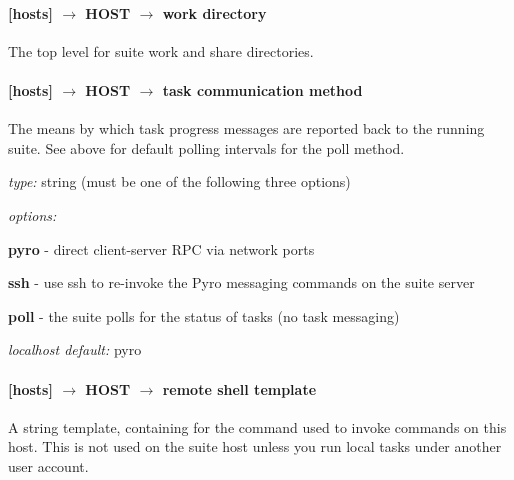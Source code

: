 \paragraph[work directory]{[hosts] $\rightarrow$ HOST $\rightarrow$ work directory }

The top level for suite work and share directories.



\paragraph[task communication method]{[hosts] $\rightarrow$ HOST $\rightarrow$ task communication method }

The means by which task progress messages are reported back to the running suite.
See above for default polling intervals for the poll method.

\begin{myitemize}
\item {\em type:} string (must be one of the following three options)
\item {\em options:}
    \begin{myitemize}
    \item {\bf pyro} - direct client-server RPC via network ports
    \item {\bf ssh} - use ssh to re-invoke the Pyro messaging commands on the suite server
    \item {\bf poll} - the suite polls for the status of tasks (no task messaging)
  \end{myitemize}
\item {\em localhost default:} pyro
\end{myitemize}

\paragraph[remote shell template]{[hosts] $\rightarrow$ HOST $\rightarrow$ remote shell template }

A string template, containing \lstinline@%s@ as a placeholder for the host name,
for the command used to invoke commands on this host.
This is not used on the suite host unless you run local tasks under
another user account.

